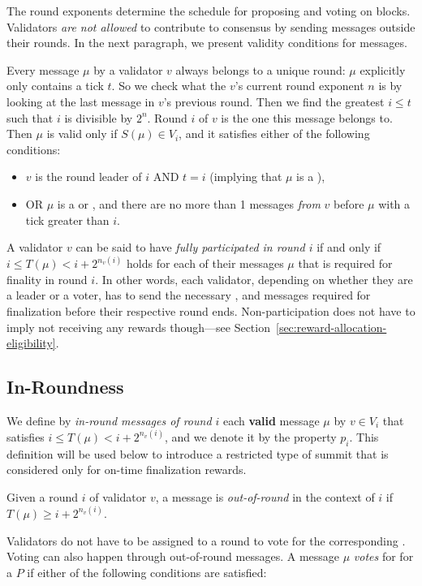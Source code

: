 The round exponents determine the schedule for proposing and voting on blocks. Validators \emph{are not allowed} to contribute to consensus by sending messages outside their rounds. In the next paragraph, we present validity conditions for messages.

Every message $\mu$ by a validator $v$ always belongs to a unique round: $\mu$ explicitly only contains a tick $t$. So we check what the $v$'s current round exponent $n$ is by looking at the last message in $v$'s previous round. Then we find the greatest $i\leq t$ such that $i$ is divisible by $2^n$. Round $i$ of $v$ is the one this message belongs to. Then $\mu$ is valid only if $S(\mu)\in V_i$, and it satisfies either of the following conditions:

\begin{itemize}
\item
  $v$ is the round leader of $i$ AND $t = i$ (implying that $\mu$ is a \PROP),
\item
  OR $\mu$ is a \CONF or \WIT, and there are no more than 1 messages
  \emph{from} $v$ before $\mu$ with a tick greater than $i$.
\end{itemize}

A validator $v$ can be said to have \emph{fully participated in round $i$} if and only if $i \leq T(\mu) <i+2^{n_v(i)}$ holds for each of their messages $\mu$ that is required for finality in round $i$. In other words, each validator, depending on whether they are a leader or a voter, has to send the necessary \PROP, \CONF and \WIT messages required for finalization before their respective round ends. Non-participation does not have to imply not receiving any rewards though---see Section~\ref{sec:reward-allocation-eligibility}.

\subsection{In-Roundness}
\label{sec:in-roundness}

We define by \emph{in-round messages of round $i$} each \textbf{valid} message $\mu$ by $v\in V_i$ that satisfies $i \leq T(\mu)< i+2^{n_v(i)}$, and we denote it by the property $p_i$. This definition will be used below to introduce a restricted type of summit that is considered only for on-time finalization rewards.

Given a round $i$ of validator $v$, a message is \emph{out-of-round} in the context of $i$ if $T(\mu)\geq i+2^{n_v(i)}$.

Validators do not have to be assigned to a round to vote for the corresponding \PROP. Voting can also happen through out-of-round messages. A message $\mu$ \emph{votes} for for a \PROP $P$ if either of the following conditions are satisfied:

